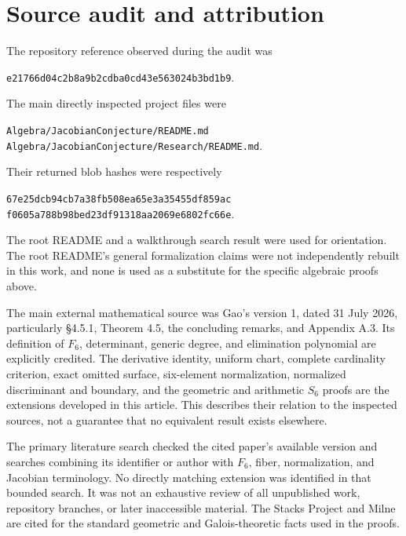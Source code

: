 \documentclass[11pt,a4paper]{article}
\theoremstyle{definition}
\newcommand{\code}[1]{\texttt{\nolinkurl{#1}}}
\begin{document}
\section{Source audit and attribution}
\label{f6:app:sources}
The repository reference observed during the audit was
\begin{center}\small
\code{e21766d04c2b8a9b2cdba0cd43e563024b3bd1b9}.
\end{center}
The main directly inspected project files were
\begin{center}\small
\code{Algebra/JacobianConjecture/README.md}\\
\code{Algebra/JacobianConjecture/Research/README.md}.
\end{center}
Their returned blob hashes were respectively
\begin{center}\small
\code{67e25dcb94cb7a38fb508ea65e3a35455df859ac}\\
\code{f0605a788b98bed23df91318aa2069e6802fc66e}.
\end{center}
The root README and a walkthrough search result were used for orientation.
The root README's general formalization claims were not independently
rebuilt in this work, and none is used as a substitute for the specific
algebraic proofs above.

The main external mathematical source was Gao's version 1, dated
31 July 2026, particularly \S4.5.1, Theorem 4.5, the concluding remarks,
and Appendix A.3. Its definition of $F_6$, determinant, generic degree,
and elimination polynomial are explicitly credited. The derivative
identity, uniform chart, complete cardinality criterion, exact omitted
surface, six-element normalization, normalized discriminant and boundary,
and the geometric and arithmetic $S_6$ proofs are the extensions developed
in this article. This describes their relation to the inspected sources,
not a guarantee that no equivalent result exists elsewhere.

The primary literature search checked the cited paper's available version
and searches combining its identifier or author with $F_6$, fiber,
normalization, and Jacobian terminology. No directly matching extension
was identified in that bounded search. It was not an exhaustive review
of all unpublished work, repository branches, or later inaccessible
material. The Stacks Project and Milne are cited for the standard
geometric and Galois-theoretic facts used in the proofs.
\end{document}
